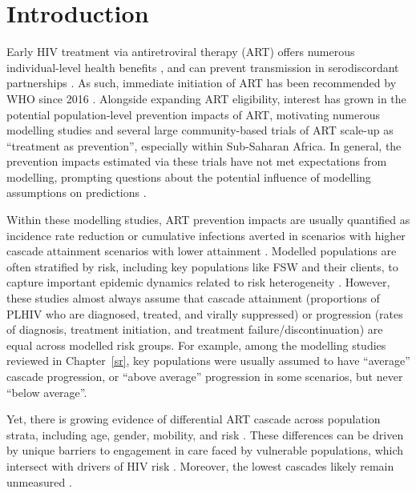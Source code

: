 \section{Introduction}\label{art.intro}
Early HIV treatment via antiretroviral therapy (ART) offers
numerous individual-level health benefits \cite{Gabillard2013,Maartens2014,Danel2015,Lundgren2015},
and can prevent transmission in serodiscordant partnerships \cite{Anglemyer2013,Cohen2016,Rodger2019}.
As such, immediate initiation of ART has been recommended by WHO since 2016 \cite{WHO2016art}.
Alongside expanding ART eligibility,
interest has grown in the potential population-level prevention impacts of ART, motivating
numerous modelling studies \cite{Granich2009,Eaton2012,Eaton2014art,Knight2022sr} and
several large community-based trials \cite{Makhema2019,Havlir2019,Hayes2019,Iwuji2018}
of ART scale-up as ``treatment as prevention'', especially within Sub-Saharan Africa.
In general, the prevention impacts estimated via these trials
have not met expectations from modelling, prompting questions about
the potential influence of modelling assumptions on predictions \cite{Baral2019}.
\par
Within these modelling studies, ART prevention impacts are usually quantified as
incidence rate reduction or cumulative infections averted
in scenarios with higher cascade attainment \vs scenarios with lower attainment \cite{Knight2022sr}.
Modelled populations are often stratified by risk,
including key populations like FSW and their clients,
to capture important epidemic dynamics related to risk heterogeneity
\cite{Stigum1994,Garnett1996,Watts2010}.
However, these studies almost always assume that cascade
attainment (\ie proportions of PLHIV who are diagnosed, treated, and virally suppressed) or
progression (\ie rates of diagnosis, treatment initiation, and treatment failure/discontinuation)
are equal across modelled risk groups.
For example, among the modelling studies reviewed in Chapter~\ref{sr},
key populations were usually assumed to have ``average'' cascade progression,
or ``above average'' progression in some scenarios, but never ``below average''.
\par
Yet, there is growing evidence of differential ART cascade across population strata,
including age, gender, mobility, and risk \cite{Hakim2018,Green2020}.
These differences can be driven by
unique barriers to engagement in care faced by vulnerable populations,
which intersect with drivers of HIV risk \cite{Wanyenze2016,Schwartz2017,Schmidt-Sane2022}.
Moreover, the lowest cascades likely remain unmeasured \cite{Hakim2018,Boothe2021}.
